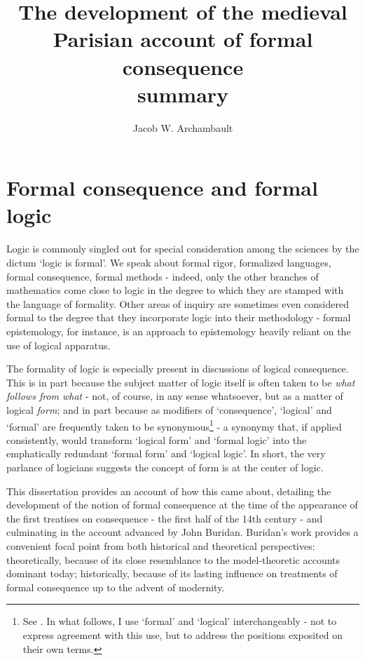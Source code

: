 \documentclass[]{article}
\title{The development of the medieval Parisian account of formal consequence \\ summary}
\author{Jacob W. Archambault}
\begin{document}
\maketitle

\begin{abstract}

\end{abstract}

\section{Formal consequence and formal logic}
Logic is commonly singled out for special consideration among the sciences by the dictum `logic is formal'. We speak about formal rigor, formalized languages, formal consequence, formal methods - indeed, only the other branches of mathematics come close to logic in the degree to which they are stamped with the language of formality. Other areas of inquiry are sometimes even considered formal to the degree that they incorporate logic into their methodology - formal epistemology, for instance, is an approach to epistemology heavily reliant on the use of logical apparatus.

The formality of logic is especially present in discussions of logical consequence. This is in part because the subject matter of logic itself is often taken to be \textit{what follows from what} - not, of course, in any sense whatsoever, but as a matter of logical \textit{form}; and in part because as modifiers of `consequence', `logical' and `formal' are frequently taken to be synonymous\footnote{See \cite[188, 193]{Tarski2002}. In what follows, I use `formal' and `logical' interchangeably - not to express agreement with this use, but to address the positions exposited on their own terms.} - a synonymy that, if applied consistently, would transform `logical form' and `formal logic' into the emphatically redundant `formal form' and `logical logic'. In short, the very parlance of logicians suggests the concept of form is at the center of logic.

This dissertation provides an account of how this came about, detailing the development of the notion of formal consequence at the time of the appearance of the first treatises on consequence - the first half of the 14th century - and culminating in the account advanced by John Buridan. Buridan's work provides a convenient focal point from both historical and theoretical perspectives: theoretically, because of its close resemblance to the model-theoretic accounts dominant today; historically, because of its lasting influence on treatments of formal consequence up to the advent of modernity.
\end{document}
